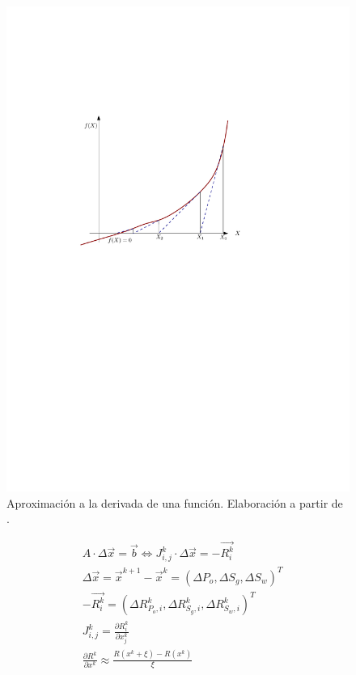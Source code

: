 \begin{figure}[h]
	\centering%
	\includegraphics[scale=0.8]{Fig/NewtonR.pdf}%
	\caption[Aproximación a la derivada de una función.]{Aproximación a la derivada de una función. Elaboración a partir de \cite{atkinson2008introduction}.} \label{fig:NewtonR}
\end{figure}
\begin{align}
\label{ec:Newton-R}&A \cdot {\Delta \vec{x}} = \vec{b} \Leftrightarrow J^{k}_{i,j} \cdot {\Delta \vec{x}} = -\vec{R^{k}_{i}}\\
&\Delta \vec{x} = \vec{x}^{k+1} - \vec{x}^{k} = \left(\Delta P_o, \Delta S_g, \Delta S_w \right)^T\\
&-\vec{R^k_i} = \left(\Delta R^k_{P_o,i}, \Delta R^k_{S_g,i}, \Delta R^k_{S_w,i} \right)^T\\
&J^k_{i,j}=\frac{\partial R^k_i}{\partial x^k_j}\\	
\label{ec:Derivative}&\frac{\partial R^k}{\partial x^k} \approx \frac{R\left(x^k + \xi \right) - R\left(x^k \right)}{\xi}
\end{align}

